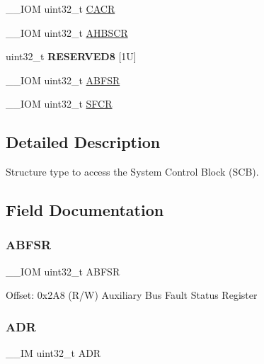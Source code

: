 \begin{DoxyCompactItemize}
\item 
\+\_\+\+\_\+\+I\+OM uint32\+\_\+t \mbox{\hyperlink{struct_s_c_b___type_a39711bf09810b078ac81b2c76c6908f6}{C\+A\+CR}}
\item 
\+\_\+\+\_\+\+I\+OM uint32\+\_\+t \mbox{\hyperlink{struct_s_c_b___type_a25bb4ac449a4122217e2ca74b9ad4e3e}{A\+H\+B\+S\+CR}}
\item 
\mbox{\label{struct_s_c_b___type_ac51834a471d74e0522dd2734079d57cb}} 
uint32\+\_\+t {\bfseries R\+E\+S\+E\+R\+V\+E\+D8} \mbox{[}1\+U\mbox{]}
\item 
\+\_\+\+\_\+\+I\+OM uint32\+\_\+t \mbox{\hyperlink{struct_s_c_b___type_aa104b9e01b129abe3de43c439916f655}{A\+B\+F\+SR}}
\item 
\+\_\+\+\_\+\+I\+OM uint32\+\_\+t \mbox{\hyperlink{struct_s_c_b___type_aaddfff3b57de6faf60bfcc938c7229c9}{S\+F\+CR}}
\end{DoxyCompactItemize}


\subsection{Detailed Description}
Structure type to access the System Control Block (S\+CB). 

\subsection{Field Documentation}
\mbox{\label{struct_s_c_b___type_aa104b9e01b129abe3de43c439916f655}} 
\subsubsection{\texorpdfstring{A\+B\+F\+SR}{ABFSR}}
{\footnotesize\ttfamily \+\_\+\+\_\+\+I\+OM uint32\+\_\+t A\+B\+F\+SR}

Offset\+: 0x2\+A8 (R/W) Auxiliary Bus Fault Status Register \mbox{\label{struct_s_c_b___type_a72572af6d5dece4947453aeabd52575f}} 
\subsubsection{\texorpdfstring{A\+DR}{ADR}}
{\footnotesize\ttfamily \+\_\+\+\_\+\+IM uint32\+\_\+t A\+DR}

